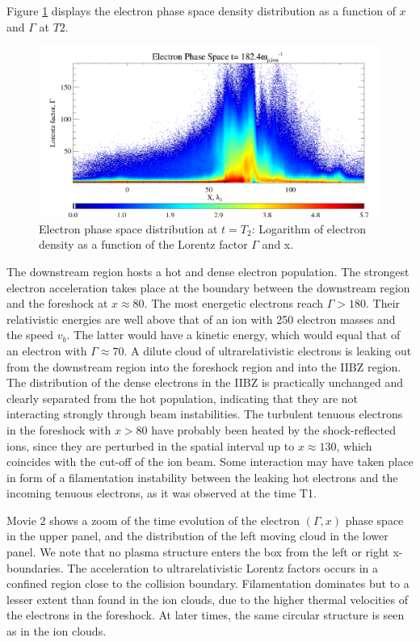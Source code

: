 \documentclass[structabstract]{aa}
\begin{document}
Figure \ref{FigElec} displays the electron phase space density distribution as a function of $x$ and $\Gamma$ at $T2$.
\begin{figure}
\centering
\includegraphics[width=\columnwidth]{15294f11.png}
\caption{Electron phase space distribution at $t=T_2$: Logarithm of electron density as a function of the Lorentz 
factor $\Gamma$ and x.}
\label{FigElec}
\end{figure}
The downstream region hosts a hot and dense electron population. The strongest electron acceleration takes place at
the boundary between the downstream region and the foreshock at $x\approx 80$. The most energetic electrons reach 
$\Gamma > 180$. Their relativistic energies are well above that of an ion with 250 electron masses and the speed $v_b$. 
The latter would have a kinetic energy, which would equal that of an electron with $\Gamma \approx 70$. A dilute cloud 
of ultrarelativistic electrons is leaking out from the downstream region into the foreshock region and into the IIBZ 
region. The distribution of the dense electrons in the IIBZ is practically unchanged and clearly separated from the 
hot population, indicating that they are not interacting strongly through beam instabilities. The turbulent tenuous 
electrons in the foreshock with $x>80$ have probably been heated by the shock-reflected ions, since they are perturbed 
in the spatial interval up to $x\approx 130$, which coincides with the cut-off of the ion beam. Some interaction may have taken place in form
of a filamentation instability between the leaking hot electrons and the incoming tenuous electrons, as it was observed
at the time T1. 

Movie 2 shows a zoom of the time evolution of the electron $(\Gamma, x)$ phase space in the upper panel, and the distribution of the left moving cloud in the lower panel.
{ We note that no plasma structure enters the box from the left or right x- boundaries.}
The acceleration to ultrarelativistic Lorentz factors occurs in a confined region close to the collision boundary.
Filamentation dominates but to a lesser extent than found in the ion clouds, due to the higher thermal velocities of the electrons in the foreshock.
At later times, the same circular structure is seen as in the ion clouds.
\end{document}
